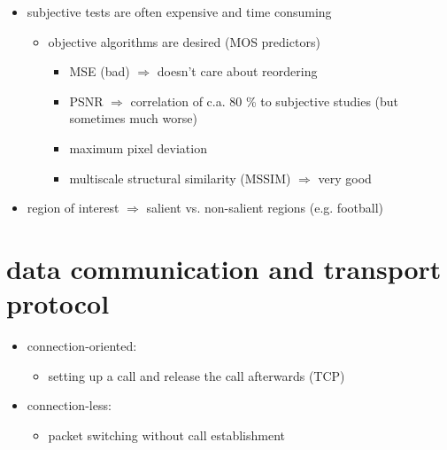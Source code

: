\documentclass[a4paper,10pt]{scrreprt}
\begin{document}
\begin{itemize}
\begin{itemize}
\end{itemize}
\item subjective tests are often expensive and time consuming
\begin{itemize}
 \item objective algorithms are desired (MOS predictors)
 \begin{itemize}
  \item MSE (bad) $\Rightarrow$ doesn't care about reordering
  \item PSNR $\Rightarrow$ correlation of c.a. 80 \% to subjective studies (but sometimes much worse)
  \item maximum pixel deviation
  \item multiscale structural similarity (MSSIM) $\Rightarrow$ very good
 \end{itemize}
\end{itemize}
\item region of interest $\Rightarrow$ salient vs. non-salient regions (e.g. football)
\end{itemize}
\chapter{data communication and transport protocol}
\begin{itemize}
 \item connection-oriented:
 \begin{itemize}
  \item setting up a call and release the call afterwards (TCP)
 \end{itemize}
 \item connection-less:
 \begin{itemize}
  \item packet switching without call establishment
 \end{itemize}
\end{itemize}
\end{document}
